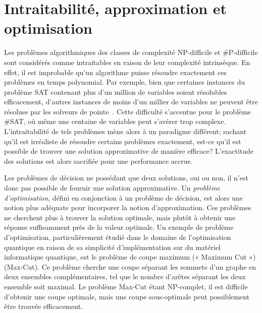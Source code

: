 
\section{Intraitabilité, approximation et optimisation}
\label{sec:intractabilite-approximation-et-optimisation}

Les problèmes algorithmiques des classes de complexité \textsf{NP}-difficile et \textsf{\#P}-difficile sont considérés comme intraitables en raison de leur complexité intrinsèque. En effet, il est improbable qu'un algorithme puisse résoudre exactement ces problèmes en temps polynomial. Par exemple, bien que certaines instances du problème SAT contenant plus d'un million de variables soient résolubles efficacement, d'autres instances de moins d'un millier de variables ne peuvent être résolues par les solveurs de pointe~\cite{froleyksSATCompetition20202021}. Cette difficulté s'accentue pour le problème \#SAT, où même une centaine de variables peut s'avérer trop complexe. L'intraitabilité de tels problèmes mène alors à un paradigme différent; sachant qu'il est irréaliste de résoudre certains problèmes exactement, est-ce qu'il est possible de trouver une solution approximative de manière efficace? L'exactitude des solutions est alors sacrifiée pour une performance accrue.

Les problèmes de décision ne possédant que deux solutions, oui ou non, il n'est donc pas possible de fournir une solution approximative. Un \textit{problème d'optimisation}, défini en conjonction à un problème de décision, est alors une notion plus adéquate pour incorporer la notion d'approximation. Ces problèmes ne cherchent plus à trouver la solution optimale, mais plutôt à obtenir une réponse suffisamment près de la valeur optimale. Un exemple de problème d'optimisation, particulièrement étudié dans le domaine de l'optimisation quantique en raison de sa simplicité d'implémentation sur du matériel informatique quantique, est le problème de coupe maximum (­« Maximum Cut ») (Max-Cut). Ce problème cherche une coupe séparant les sommets d'un graphe en deux ensembles complémentaires, tel que le nombre d'arêtes séparant les deux ensemble soit maximal. Le problème Max-Cut étant \textsf{NP}-complet, il est difficile d'obtenir une coupe optimale, mais une coupe sous-optimale peut possiblement être trouvée efficacement.


